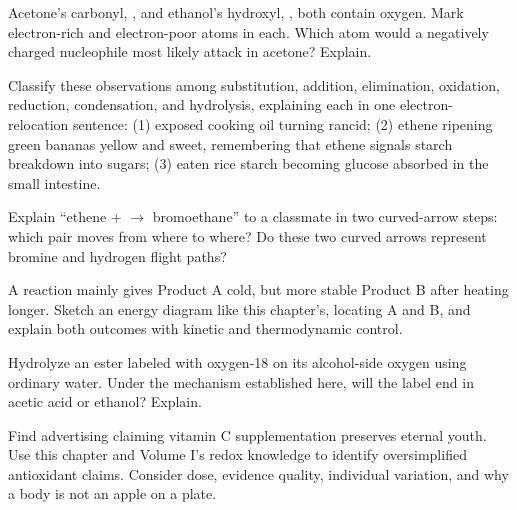 \begin{sikaoti}
\item Acetone's carbonyl, , and ethanol's hydroxyl, , both contain oxygen. Mark electron-rich and electron-poor atoms in each. Which atom would a negatively charged nucleophile most likely attack in acetone? Explain.
\item Classify these observations among substitution, addition, elimination, oxidation, reduction, condensation, and hydrolysis, explaining each in one electron-relocation sentence: (1) exposed cooking oil turning rancid; (2) ethene ripening green bananas yellow and sweet, remembering that ethene signals starch breakdown into sugars; (3) eaten rice starch becoming glucose absorbed in the small intestine.
\item Explain ``ethene +  $\rightarrow$ bromoethane'' to a classmate in two curved-arrow steps: which pair moves from where to where? Do these two curved arrows represent bromine and hydrogen flight paths?
\item A reaction mainly gives Product A cold, but more stable Product B after heating longer. Sketch an energy diagram like this chapter's, locating A and B, and explain both outcomes with kinetic and thermodynamic control.
\item Hydrolyze an ester labeled with oxygen-18 on its alcohol-side oxygen using ordinary water. Under the mechanism established here, will the label end in acetic acid or ethanol? Explain.
\item Find advertising claiming vitamin C supplementation preserves eternal youth. Use this chapter and Volume I's redox knowledge to identify oversimplified antioxidant claims. Consider dose, evidence quality, individual variation, and why a body is not an apple on a plate.
\end{sikaoti}
